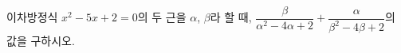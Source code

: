 이차방정식 $x^2-5x+2=0$의 두 근을 $\alpha$, $\beta$라 할 때, $\dfrac{\beta}{\alpha^2-4\alpha+2}+\dfrac{\alpha}{\beta^2-4\beta+2}$의 값을 구하시오.
